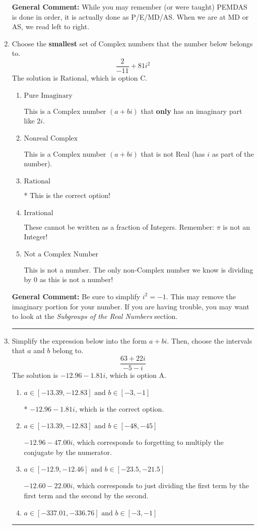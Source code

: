 \documentclass{extbook}[14pt]
\newcommand{\litem}[1]{\item #1

\rule{\textwidth}{0.4pt}}
\begin{document}
\begin{enumerate}
{\textbf{General Comment:} While you may remember (or were taught) PEMDAS is done in order, it is actually done as P/E/MD/AS. When we are at MD or AS, we read left to right.
}
\litem{
Choose the \textbf{smallest} set of Complex numbers that the number below belongs to.
\[ \frac{2}{-11}+81i^2 \]The solution is \( \text{Rational} \), which is option C.\begin{enumerate}[label=\Alph*.]
\item \( \text{Pure Imaginary} \)

This is a Complex number $(a+bi)$ that \textbf{only} has an imaginary part like $2i$.
\item \( \text{Nonreal Complex} \)

This is a Complex number $(a+bi)$ that is not Real (has $i$ as part of the number).
\item \( \text{Rational} \)

* This is the correct option!
\item \( \text{Irrational} \)

These cannot be written as a fraction of Integers. Remember: $\pi$ is not an Integer!
\item \( \text{Not a Complex Number} \)

This is not a number. The only non-Complex number we know is dividing by 0 as this is not a number!
\end{enumerate}

\textbf{General Comment:} Be sure to simplify $i^2 = -1$. This may remove the imaginary portion for your number. If you are having trouble, you may want to look at the \textit{Subgroups of the Real Numbers} section.
}
\litem{
Simplify the expression below into the form $a+bi$. Then, choose the intervals that $a$ and $b$ belong to.
\[ \frac{63 + 22 i}{-5 - i} \]The solution is \( -12.96  - 1.81 i \), which is option A.\begin{enumerate}[label=\Alph*.]
\item \( a \in [-13.39, -12.83] \text{ and } b \in [-3, -1] \)

* $-12.96  - 1.81 i$, which is the correct option.
\item \( a \in [-13.39, -12.83] \text{ and } b \in [-48, -45] \)

 $-12.96  - 47.00 i$, which corresponds to forgetting to multiply the conjugate by the numerator.
\item \( a \in [-12.9, -12.46] \text{ and } b \in [-23.5, -21.5] \)

 $-12.60  - 22.00 i$, which corresponds to just dividing the first term by the first term and the second by the second.
\item \( a \in [-337.01, -336.76] \text{ and } b \in [-3, -1] \)


\end{enumerate}}
\end{enumerate}
\end{document}
